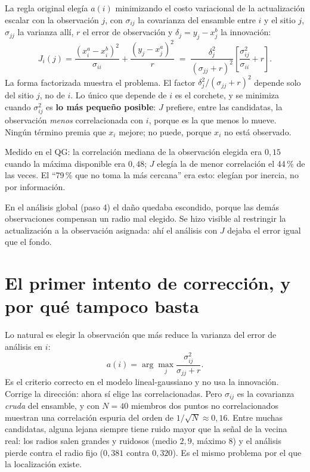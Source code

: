 \documentclass[11pt]{article}
\begin{document}
La regla original elegía $a(i)$ minimizando el costo variacional de la actualización escalar
con la observación $j$, con $\sigma_{ij}$ la covarianza del ensamble entre $i$ y el sitio $j$,
$\sigma_{jj}$ la varianza allí, $r$ el error de observación y $\delta_j = y_j - x^b_j$ la
innovación:
\begin{equation}
  J_i(j) = \frac{(x^a_i - x^b_i)^2}{\sigma_{ii}} + \frac{(y_j - x^a_j)^2}{r}
  \;=\; \frac{\delta_j^2}{(\sigma_{jj}+r)^2}\left[\frac{\sigma_{ij}^2}{\sigma_{ii}} + r\right].
  \label{eq:J}
\end{equation}
La forma factorizada muestra el problema. El factor $\delta_j^2/(\sigma_{jj}+r)^2$ depende solo del
sitio $j$, no de $i$. Lo único que depende de $i$ es el corchete, y se minimiza cuando
$\sigma_{ij}^2$ es \textbf{lo más pequeño posible}: $J$ prefiere, entre las candidatas, la
observación \emph{menos} correlacionada con $i$, porque es la que menos lo mueve. Ningún término
premia que $x_i$ mejore; no puede, porque $x_i$ no está observado.

Medido en el QG: la correlación mediana de la observación elegida era $0{,}15$ cuando la
máxima disponible era $0{,}48$; $J$ elegía la de menor correlación el 44\,\% de las veces. El
``79\,\% que no toma la más cercana'' era esto: elegían por inercia, no por información.

En el análisis global (paso 4) el daño quedaba escondido, porque las demás observaciones
compensan un radio mal elegido. Se hizo visible al restringir la actualización a la observación
asignada: ahí el análisis con $J$ dejaba el error igual que el fondo.

\section{El primer intento de corrección, y por qué tampoco basta}

Lo natural es elegir la observación que más reduce la varianza del error de análisis en $i$:
\begin{equation}
  a(i) = \arg\max_j \frac{\sigma_{ij}^2}{\sigma_{jj}+r}.
  \label{eq:var}
\end{equation}
Es el criterio correcto en el modelo lineal-gaussiano y no usa la innovación. Corrige la
dirección: ahora sí elige las correlacionadas. Pero $\sigma_{ij}$ es la covarianza \emph{cruda}
del ensamble, y con $N=40$ miembros dos puntos no correlacionados muestran una correlación
espuria del orden de $1/\sqrt{N}\approx 0{,}16$. Entre muchas candidatas, alguna lejana siempre
tiene ruido mayor que la señal de la vecina real: los radios salen grandes y ruidosos
(medio $2{,}9$, máximo $8$) y el análisis pierde contra el radio fijo ($0{,}381$ contra
$0{,}320$). Es el mismo problema por el que la localización existe.
\end{document}
